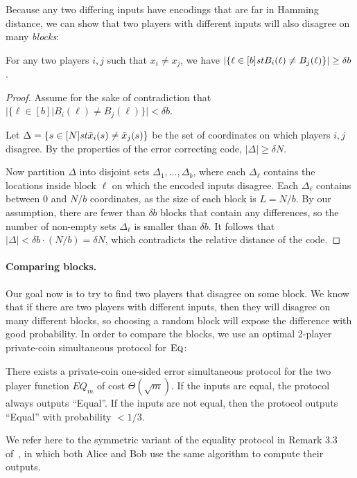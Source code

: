 				Because any two differing inputs have encodings that are far in Hamming distance,
				we can show that two players with different inputs will also disagree on many \emph{blocks}:
		\begin{lemma}
			\label{PlayersFarApart}
			For any two players $i,j$ such that $x_i \neq x_j$,
			we have
			$\left|\{ \ell \in [b] \mathit{st} B_i(\ell) \neq B_j(\ell)  \} \right| \geq \delta b$.
		\end{lemma}
		\begin{proof}
			Assume for the sake of contradiction that $|\{\ell \in [b]|B_i(\ell) \neq B_j(\ell)\}| < \delta b$.

			Let $\Delta = \{  s \in [N]  \mathit{st} \bar{x}_i(s) \neq \bar{x}_j(s)  \}$
			be the set of coordinates on which players $i,j$ disagree.
			By the properties of the error correcting code, $|\Delta| \geq \delta N$.


			Now partition $\Delta$ into disjoint sets $\Delta_1,\ldots,\Delta_b$,
			where each $\Delta_\ell$ contains the locations inside block $\ell$ on which the encoded inputs disagree.
			Each $\Delta_\ell$ contains between $0$ and $N/b$ coordinates, as the size of each block is $L=N/b$.
			By our assumption, there are fewer than $\delta b$ blocks that contain any differences,
			so the number of non-empty sets $\Delta_\ell$ is smaller than $\delta b$.
			It follows that 
			$|\Delta| < \delta b \cdot (N/b) = \delta N$, which contradicts
			the relative distance of the code.
		\end{proof}
	
		\paragraph{Comparing blocks.}
		Our goal now is to try to find two players that disagree on some block.
		We know that if there are two players with different inputs, then they will disagree on many different blocks,
		so choosing a random block will expose the difference with good probability.
		In order to compare the blocks, we use an optimal 2-player private-coin simultaneous protocol for $\text{\textsc{Eq}}$:
	\begin{theorem}
		There exists a private-coin one-sided error simultaneous protocol for the two player function $EQ_m$ of cost $\Theta(\sqrt{m})$.
		If the inputs are equal, the protocol always outputs ``Equal''. If the inputs are not equal, then the protocol outputs ``Equal''
		with probability $< 1/3$.
	\end{theorem}
	\begin{remark}
		We refer here to the symmetric variant of the equality protocol in Remark 3.3 of~\cite{BK97}, in which both Alice and Bob use the same algorithm to compute their outputs.
	\end{remark}


